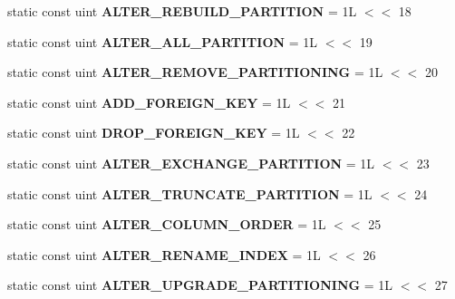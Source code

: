 \begin{DoxyCompactItemize}
\item 
\mbox{\label{classAlter__info_a92c66e6848e0f3f6bceeec9d93b542ec}} 
static const uint {\bfseries A\+L\+T\+E\+R\+\_\+\+R\+E\+B\+U\+I\+L\+D\+\_\+\+P\+A\+R\+T\+I\+T\+I\+ON} = 1\+L $<$$<$ 18
\item 
\mbox{\label{classAlter__info_af97e903ac6fe35ab4c49f9acbc3ef97b}} 
static const uint {\bfseries A\+L\+T\+E\+R\+\_\+\+A\+L\+L\+\_\+\+P\+A\+R\+T\+I\+T\+I\+ON} = 1\+L $<$$<$ 19
\item 
\mbox{\label{classAlter__info_a74d5d07a09ce903fac3ee31951b1aac3}} 
static const uint {\bfseries A\+L\+T\+E\+R\+\_\+\+R\+E\+M\+O\+V\+E\+\_\+\+P\+A\+R\+T\+I\+T\+I\+O\+N\+I\+NG} = 1\+L $<$$<$ 20
\item 
\mbox{\label{classAlter__info_a8f727ef476b323a6078a7f7e94fa3cb7}} 
static const uint {\bfseries A\+D\+D\+\_\+\+F\+O\+R\+E\+I\+G\+N\+\_\+\+K\+EY} = 1\+L $<$$<$ 21
\item 
\mbox{\label{classAlter__info_a0d74955e176b2bb37ccce14371bea0d6}} 
static const uint {\bfseries D\+R\+O\+P\+\_\+\+F\+O\+R\+E\+I\+G\+N\+\_\+\+K\+EY} = 1\+L $<$$<$ 22
\item 
\mbox{\label{classAlter__info_a60f8748fd86c69de133e37f352a59d8f}} 
static const uint {\bfseries A\+L\+T\+E\+R\+\_\+\+E\+X\+C\+H\+A\+N\+G\+E\+\_\+\+P\+A\+R\+T\+I\+T\+I\+ON} = 1\+L $<$$<$ 23
\item 
\mbox{\label{classAlter__info_ae31a825a0c70deeb3e90f4e8733ee369}} 
static const uint {\bfseries A\+L\+T\+E\+R\+\_\+\+T\+R\+U\+N\+C\+A\+T\+E\+\_\+\+P\+A\+R\+T\+I\+T\+I\+ON} = 1\+L $<$$<$ 24
\item 
\mbox{\label{classAlter__info_a2d6b32dd2c66d6d2c70229bde5209e63}} 
static const uint {\bfseries A\+L\+T\+E\+R\+\_\+\+C\+O\+L\+U\+M\+N\+\_\+\+O\+R\+D\+ER} = 1\+L $<$$<$ 25
\item 
\mbox{\label{classAlter__info_adb58c1543cf980c74ff559426f833b66}} 
static const uint {\bfseries A\+L\+T\+E\+R\+\_\+\+R\+E\+N\+A\+M\+E\+\_\+\+I\+N\+D\+EX} = 1\+L $<$$<$ 26
\item 
\mbox{\label{classAlter__info_a750825ff74b5bb7828fd019f096469bc}} 
static const uint {\bfseries A\+L\+T\+E\+R\+\_\+\+U\+P\+G\+R\+A\+D\+E\+\_\+\+P\+A\+R\+T\+I\+T\+I\+O\+N\+I\+NG} = 1\+L $<$$<$ 27
\end{DoxyCompactItemize}


